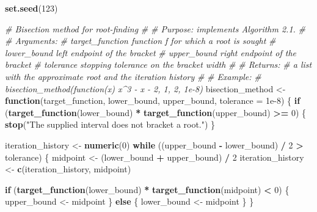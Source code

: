 \documentclass[
]{article}
\newenvironment{Shaded}{\begin{snugshade}}{\end{snugshade}}
\newcommand{\AttributeTok}[1]{\textcolor[rgb]{0.13,0.29,0.53}{#1}}
\newcommand{\CommentTok}[1]{\textcolor[rgb]{0.56,0.35,0.01}{\textit{#1}}}
\newcommand{\ControlFlowTok}[1]{\textcolor[rgb]{0.13,0.29,0.53}{\textbf{#1}}}
\newcommand{\DecValTok}[1]{\textcolor[rgb]{0.00,0.00,0.81}{#1}}
\newcommand{\FloatTok}[1]{\textcolor[rgb]{0.00,0.00,0.81}{#1}}
\newcommand{\FunctionTok}[1]{\textcolor[rgb]{0.13,0.29,0.53}{\textbf{#1}}}
\newcommand{\NormalTok}[1]{#1}
\newcommand{\OtherTok}[1]{\textcolor[rgb]{0.56,0.35,0.01}{#1}}
\newcommand{\SpecialCharTok}[1]{\textcolor[rgb]{0.81,0.36,0.00}{\textbf{#1}}}
\newcommand{\StringTok}[1]{\textcolor[rgb]{0.31,0.60,0.02}{#1}}
\begin{document}
\begin{Shaded}
\begin{Highlighting}[]
\FunctionTok{set.seed}\NormalTok{(}\DecValTok{123}\NormalTok{)}

\CommentTok{\#\textquotesingle{} Bisection method for root{-}finding}
\CommentTok{\#\textquotesingle{}}
\CommentTok{\#\textquotesingle{} Purpose: implements Algorithm 2.1.}
\CommentTok{\#\textquotesingle{}}
\CommentTok{\#\textquotesingle{} Arguments:}
\CommentTok{\#\textquotesingle{}   target\_function   function f for which a root is sought}
\CommentTok{\#\textquotesingle{}   lower\_bound       left endpoint of the bracket}
\CommentTok{\#\textquotesingle{}   upper\_bound       right endpoint of the bracket}
\CommentTok{\#\textquotesingle{}   tolerance         stopping tolerance on the bracket width}
\CommentTok{\#\textquotesingle{}}
\CommentTok{\#\textquotesingle{} Returns:}
\CommentTok{\#\textquotesingle{}   a list with the approximate root and the iteration history}
\CommentTok{\#\textquotesingle{}}
\CommentTok{\#\textquotesingle{} Example:}
\CommentTok{\#\textquotesingle{}   bisection\_method(function(x) x\^{}3 {-} x {-} 2, 1, 2, 1e{-}8)}
\NormalTok{bisection\_method }\OtherTok{\textless{}{-}} \ControlFlowTok{function}\NormalTok{(target\_function, lower\_bound, upper\_bound, }\AttributeTok{tolerance =} \FloatTok{1e{-}8}\NormalTok{) \{}
  \ControlFlowTok{if}\NormalTok{ (}\FunctionTok{target\_function}\NormalTok{(lower\_bound) }\SpecialCharTok{*} \FunctionTok{target\_function}\NormalTok{(upper\_bound) }\SpecialCharTok{\textgreater{}=} \DecValTok{0}\NormalTok{) \{}
    \FunctionTok{stop}\NormalTok{(}\StringTok{"The supplied interval does not bracket a root."}\NormalTok{)}
\NormalTok{  \}}

\NormalTok{  iteration\_history }\OtherTok{\textless{}{-}} \FunctionTok{numeric}\NormalTok{(}\DecValTok{0}\NormalTok{)}
  \ControlFlowTok{while}\NormalTok{ ((upper\_bound }\SpecialCharTok{{-}}\NormalTok{ lower\_bound) }\SpecialCharTok{/} \DecValTok{2} \SpecialCharTok{\textgreater{}}\NormalTok{ tolerance) \{}
\NormalTok{    midpoint }\OtherTok{\textless{}{-}}\NormalTok{ (lower\_bound }\SpecialCharTok{+}\NormalTok{ upper\_bound) }\SpecialCharTok{/} \DecValTok{2}
\NormalTok{    iteration\_history }\OtherTok{\textless{}{-}} \FunctionTok{c}\NormalTok{(iteration\_history, midpoint)}

    \ControlFlowTok{if}\NormalTok{ (}\FunctionTok{target\_function}\NormalTok{(lower\_bound) }\SpecialCharTok{*} \FunctionTok{target\_function}\NormalTok{(midpoint) }\SpecialCharTok{\textless{}} \DecValTok{0}\NormalTok{) \{}
\NormalTok{      upper\_bound }\OtherTok{\textless{}{-}}\NormalTok{ midpoint}
\NormalTok{    \} }\ControlFlowTok{else}\NormalTok{ \{}
\NormalTok{      lower\_bound }\OtherTok{\textless{}{-}}\NormalTok{ midpoint}
\NormalTok{    \}}
\NormalTok{  \}}


\end{Highlighting}
\end{Shaded}
\end{document}

